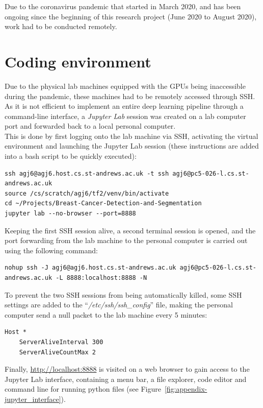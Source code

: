 Due to the coronavirus pandemic that started in March 2020, and has been ongoing since the beginning of this research project (June 2020 to August 2020), work had to be conducted remotely.

\section{Coding environment}

Due to the physical lab machines equipped with the GPUs being inaccessible during the pandemic, these machines had to be remotely accessed through SSH. As it is not efficient to implement an entire deep learning pipeline through a command-line interface, a \textit{Jupyter Lab} session was created on a lab computer port and forwarded back to a local personal computer.\\

This is done by first logging onto the lab machine via SSH, activating the virtual environment and launching the Jupyter Lab session (these instructions are added into a bash script to be quickly executed):

\begin{lstlisting}
ssh agj6@agj6.host.cs.st-andrews.ac.uk -t ssh agj6@pc5-026-l.cs.st-andrews.ac.uk
source /cs/scratch/agj6/tf2/venv/bin/activate
cd ~/Projects/Breast-Cancer-Detection-and-Segmentation
jupyter lab --no-browser --port=8888
\end{lstlisting}

Keeping the first SSH session alive, a second terminal session is opened, and the port forwarding from the lab machine  to the personal computer is carried out using  the following command:

\begin{lstlisting}
nohup ssh -J agj6@agj6.host.cs.st-andrews.ac.uk agj6@pc5-026-l.cs.st-andrews.ac.uk -L 8888:localhost:8888 -N
\end{lstlisting}

To prevent the two SSH sessions from being automatically killed, some SSH settings are added to the ``\textit{/etc/ssh/ssh\_config}'' file, making the personal computer send a null packet to the lab machine every 5 minutes:

\begin{lstlisting}
Host *
    ServerAliveInterval 300
    ServerAliveCountMax 2
\end{lstlisting}

Finally, \url{http://localhost:8888}  is visited on a web browser to gain access to  the Jupyter Lab interface, containing a menu bar, a file explorer, code editor and command line for running python files (see Figure~\ref{fig:appendix-jupyter_interface}).

